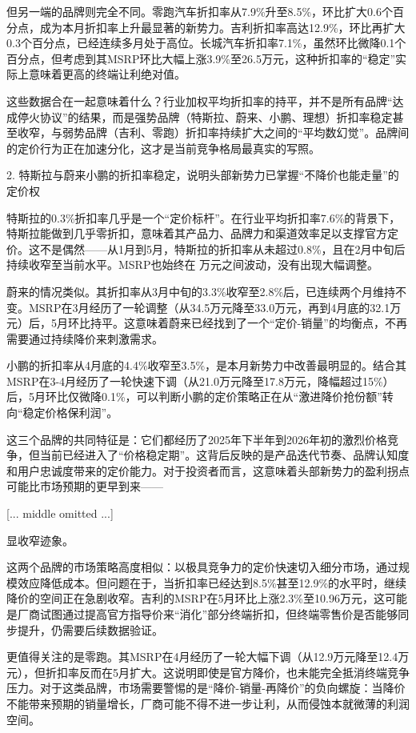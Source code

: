 \documentclass[11pt]{ctexart}
\begin{document}
但另一端的品牌则完全不同。零跑汽车折扣率从7.9\%升至8.5\%，环比扩大0.6个百分点，成为本月折扣率上升最显著的新势力。吉利折扣率高达12.9\%，环比再扩大0.3个百分点，已经连续多月处于高位。长城汽车折扣率7.1\%，虽然环比微降0.1个百分点，但考虑到其MSRP环比大幅上涨3.9\%至26.5万元，这种折扣率的“稳定”实际上意味着更高的终端让利绝对值。

这些数据合在一起意味着什么？行业加权平均折扣率的持平，并不是所有品牌“达成停火协议”的结果，而是强势品牌（特斯拉、蔚来、小鹏、理想）折扣率稳定甚至收窄，与弱势品牌（吉利、零跑）折扣率持续扩大之间的“平均数幻觉”。品牌间的定价行为正在加速分化，这才是当前竞争格局最真实的写照。

2. 特斯拉与蔚来小鹏的折扣率稳定，说明头部新势力已掌握“不降价也能走量”的定价权

特斯拉的0.3\%折扣率几乎是一个“定价标杆”。在行业平均折扣率7.6\%的背景下，特斯拉能做到几乎零折扣，意味着其产品力、品牌力和渠道效率足以支撑官方定价。这不是偶然——从1月到5月，特斯拉的折扣率从未超过0.8\%，且在2月中旬后持续收窄至当前水平。MSRP也始终在 万元之间波动，没有出现大幅调整。

蔚来的情况类似。其折扣率从3月中旬的3.3\%收窄至2.8\%后，已连续两个月维持不变。MSRP在3月经历了一轮调整（从34.5万元降至33.0万元，再到4月底的32.1万元）后，5月环比持平。这意味着蔚来已经找到了一个“定价-销量”的均衡点，不再需要通过持续降价来刺激需求。

小鹏的折扣率从4月底的4.4\%收窄至3.5\%，是本月新势力中改善最明显的。结合其MSRP在3-4月经历了一轮快速下调（从21.0万元降至17.8万元，降幅超过15\%）后，5月环比仅微降0.1\%，可以判断小鹏的定价策略正在从“激进降价抢份额”转向“稳定价格保利润”。

这三个品牌的共同特征是：它们都经历了2025年下半年到2026年初的激烈价格竞争，但当前已经进入了“价格稳定期”。这背后反映的是产品迭代节奏、品牌认知度和用户忠诚度带来的定价能力。对于投资者而言，这意味着头部新势力的盈利拐点可能比市场预期的更早到来——

[... middle omitted ...]

显收窄迹象。

这两个品牌的市场策略高度相似：以极具竞争力的定价快速切入细分市场，通过规模效应降低成本。但问题在于，当折扣率已经达到8.5\%甚至12.9\%的水平时，继续降价的空间正在急剧收窄。吉利的MSRP在5月环比上涨2.3\%至10.96万元，这可能是厂商试图通过提高官方指导价来“消化”部分终端折扣，但终端零售价是否能够同步提升，仍需要后续数据验证。

更值得关注的是零跑。其MSRP在4月经历了一轮大幅下调（从12.9万元降至12.4万元），但折扣率反而在5月扩大。这说明即使是官方降价，也未能完全抵消终端竞争压力。对于这类品牌，市场需要警惕的是“降价-销量-再降价”的负向螺旋：当降价不能带来预期的销量增长，厂商可能不得不进一步让利，从而侵蚀本就微薄的利润空间。
\end{document}
